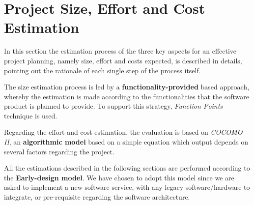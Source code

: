 \section{Project Size, Effort and Cost Estimation}
\label{sec:SizeEffortCost}

In this section the estimation process of the three key aspects for an effective project planning, namely size, effort and costs expected, is described in details, pointing out the rationale of each single step of the process itself.

The size estimation process is led by a \textbf{functionality-provided} based approach, whereby the estimation is made according to the functionalities that the software product is planned to provide. To support this strategy, \textit{Function Points} technique is used.

Regarding the effort and cost estimation, the evaluation is based on \textit{COCOMO II}, an \textbf{algorithmic model} based on a simple equation which output depends on several factors regarding the project.

All the estimations described in the following sections are performed according to the \textbf{Early-design model}. We have chosen to adopt this model since we are asked to implement a new software service, with any legacy software/hardware to integrate, or pre-requisite regarding the software architecture.

	
	

